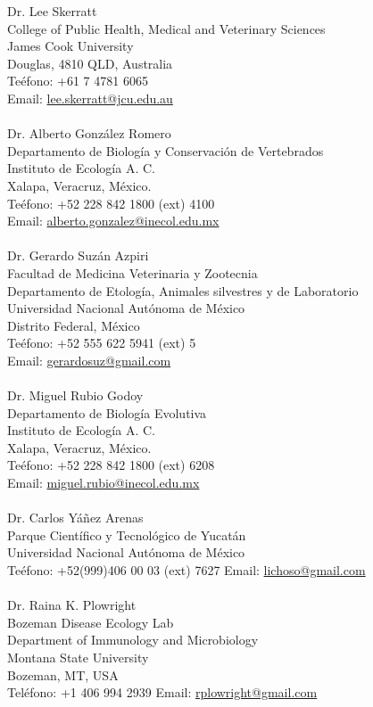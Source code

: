 \documentclass[11pt, letter]{article}
\begin{document}
Dr. Lee Skerratt\\
College of Public Health, Medical and Veterinary Sciences \\
James Cook University\\
Douglas, 4810 QLD, Australia\\
Te\'efono: +61 7 4781 6065\\
Email: \href{mailto:lee.skerratt@jcu.edu.au}{lee.skerratt@jcu.edu.au}\\
\\
Dr. Alberto Gonz\'alez Romero\\
Departamento de Biolog\'ia y Conservaci\'on de Vertebrados \\
Instituto de Ecolog\'ia A. C.\\
Xalapa, Veracruz, M\'exico.\\
Te\'efono: +52 228 842 1800 (ext) 4100\\
Email: \href{mailto:alberto.gonzalez@inecol.edu.mx}{alberto.gonzalez@inecol.edu.mx}\\
\\
Dr. Gerardo Suz\'an Azpiri\\
Facultad de Medicina Veterinaria y Zootecnia\\
Departamento de Etolog\'ia, Animales silvestres y de Laboratorio\\
Universidad Nacional Aut\'onoma de M\'exico\\
Distrito Federal, M\'exico\\
Te\'efono: +52 555 622 5941 (ext) 5\\
Email: \href{mailto:gerardosuz@gmail.com}{gerardosuz@gmail.com}\\
\\
Dr. Miguel Rubio Godoy\\
Departamento de Biolog\'ia Evolutiva\\
Instituto de Ecolog\'ia A. C.\\
Xalapa, Veracruz, M\'exico.\\
Te\'efono: +52 228 842 1800 (ext) 6208\\
Email: \href{mailto:miguel.rubio@inecol.edu.mx}{miguel.rubio@inecol.edu.mx}\\
\\
Dr. Carlos Yáñez Arenas\\
Parque Científico y Tecnológico de Yucat\'an\\
Universidad Nacional Autónoma de México\\
Te\'efono: +52(999)406 00 03 (ext) 7627
Email:  \href{mailto:lichoso@gmail.com}{lichoso@gmail.com}\\
\\
Dr. Raina K. Plowright\\
Bozeman Disease Ecology Lab\\
Department of Immunology and Microbiology\\
Montana State University\\
Bozeman, MT, USA\\
Tel\'efono: +1 406 994 2939
Email: \href{mailto:rplowright@gmail.com}{rplowright@gmail.com}
\end{document}

